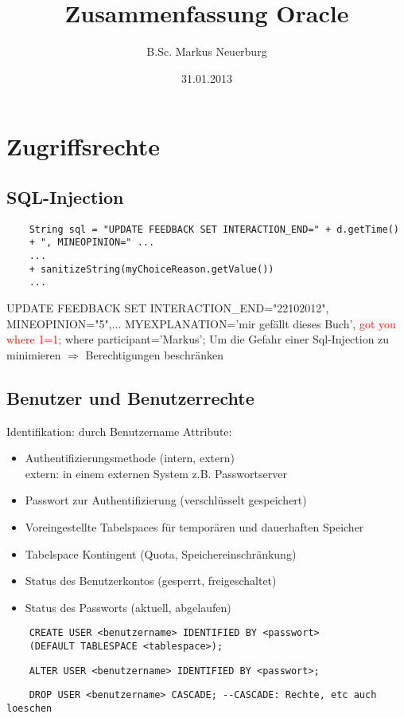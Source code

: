\documentclass[12pt]{scrreprt}
\title{Zusammenfassung Oracle}
\author{B.Sc. Markus Neuerburg}
\date{31.01.2013}
\begin{document}
\setlength{\topmargin}{0cm}
\parindent 0pt
\chapter{Zugriffsrechte}
\section{SQL-Injection}
\begin{lstlisting}
	String sql = "UPDATE FEEDBACK SET INTERACTION_END=" + d.getTime()
	+ ", MINEOPINION=" ...
	...
	+ sanitizeString(myChoiceReason.getValue())
	...
\end{lstlisting}
UPDATE FEEDBACK SET\newline
INTERACTION\_END="22102012",\newline
MINEOPINION="5",...
MYEXPLANATION='mir gefällt dieses Buch',\newline
\hspace*{5mm}\textcolor{red}{got you where 1=1;}\newline
where participant='Markus';\newline
\newline
Um die Gefahr einer Sql-Injection zu minimieren $\Rightarrow$ Berechtigungen beschränken\newline
\newline
\section{Benutzer und Benutzerrechte}
Identifikation: durch Benutzername\newline
Attribute:
\begin{itemize}
	\item Authentifizierungsmethode (intern, extern)\hfill \\
	extern: in einem externen System z.B. Passwortserver
	\item Passwort zur Authentifizierung (verschlüsselt gespeichert)
	\item Voreingestellte Tabelspaces für temporären und dauerhaften Speicher
	\item Tabelspace Kontingent (Quota, Speichereinschränkung)
	\item Status des Benutzerkontos (gesperrt, freigeschaltet)
	\item Status des Passworts (aktuell, abgelaufen)
\end{itemize}
\begin{lstlisting}
	CREATE USER <benutzername> IDENTIFIED BY <passwort>
	(DEFAULT TABLESPACE <tablespace>);
\end{lstlisting}
\begin{lstlisting}
	ALTER USER <benutzername> IDENTIFIED BY <passwort>;
\end{lstlisting}
\begin{lstlisting}
	DROP USER <benutzername> CASCADE; --CASCADE: Rechte, etc auch loeschen
\end{lstlisting}
\end{document}
